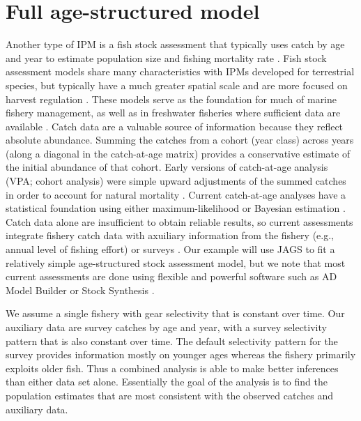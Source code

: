 \documentclass[
]{krantz}
\begin{document}
\hypertarget{CAGEAN}{%
\section{Full age-structured model}\label{CAGEAN}}

Another type of IPM is a fish stock assessment that typically uses catch by age and year to estimate population size and fishing mortality rate \citep{millar.meyer2000, schaub.etal_2024}. Fish stock assessment models share many characteristics with IPMs developed for terrestrial species, but typically have a much greater spatial scale and are more focused on harvest regulation \citep{schaub.etal_2024}. These models serve as the foundation for much of marine fishery management, as well as in freshwater fisheries where sufficient data are available \citep[e.g.,][]{fielder.bence_2014}. Catch data are a valuable source of information because they reflect absolute abundance. Summing the catches from a cohort (year class) across years (along a diagonal in the catch-at-age matrix) provides a conservative estimate of the initial abundance of that cohort. Early versions of catch-at-age analysis (VPA; cohort analysis) were simple upward adjustments of the summed catches in order to account for natural mortality \citep{ricker1975}. Current catch-at-age analyses have a statistical foundation using either maximum-likelihood or Bayesian estimation \citep{maunder.punt_2013}. Catch data alone are insufficient to obtain reliable results, so current assessments integrate fishery catch data with axuiliary information from the fishery (e.g., annual level of fishing effort) or surveys \citep{deriso.etal_1985, maunder.punt_2013, schaub.etal_2024}. Our example will use JAGS to fit a relatively simple age-structured stock assessment model, but we note that most current assessments are done using flexible and powerful software such as AD Model Builder or Stock Synthesis \citep{fournier.etal_2012, methot.wetzell_2013}.

We assume a single fishery with gear selectivity that is constant over time. Our auxiliary data are survey catches by age and year, with a survey selectivity pattern that is also constant over time. The default selectivity pattern for the survey provides information mostly on younger ages whereas the fishery primarily exploits older fish. Thus a combined analysis is able to make better inferences than either data set alone. Essentially the goal of the analysis is to find the population estimates that are most consistent with the observed catches and auxiliary data.
\end{document}
